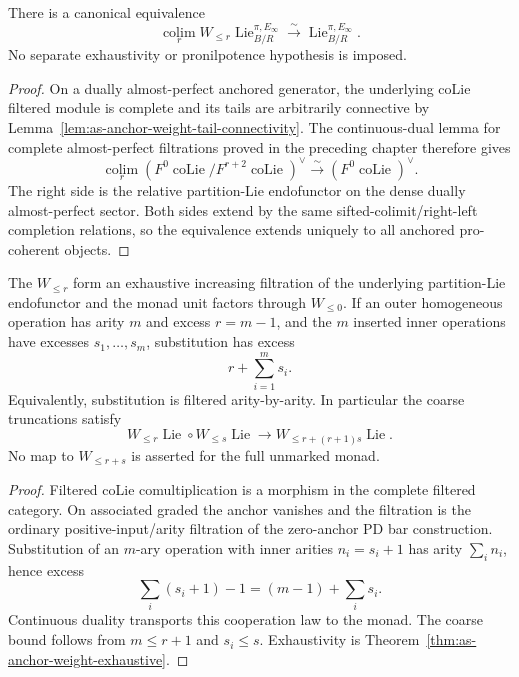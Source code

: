 \begin{theorem}
\label{thm:as-anchor-weight-exhaustive}
There is a canonical equivalence
\[
\boxed{
    \operatorname*{colim}_{r}
    W_{\le r}
    \operatorname{Lie}^{\pi,E_\infty}_{B/R}
    \xrightarrow{\sim}
    \operatorname{Lie}^{\pi,E_\infty}_{B/R}.
}
\]
No separate exhaustivity or pronilpotence hypothesis is imposed.
\end{theorem}

\begin{proof}
On a dually almost-perfect anchored generator, the underlying coLie filtered
module is complete and its tails are arbitrarily connective by
Lemma~\ref{lem:as-anchor-weight-tail-connectivity}.  The continuous-dual
lemma for complete almost-perfect filtrations proved in the preceding chapter
therefore gives
\[
    \operatorname*{colim}_r
    \left(
        F^0\operatorname{coLie}/
        F^{r+2}\operatorname{coLie}
    \right)^\vee
    \xrightarrow{\sim}
    \left(
        F^0\operatorname{coLie}
    \right)^\vee.
\]
The right side is the relative partition-Lie endofunctor on the dense
dually almost-perfect sector.  Both sides extend by the same
sifted-colimit/right-left completion relations, so the equivalence extends
uniquely to all anchored pro-coherent objects.
\end{proof}

\begin{theorem}
\label{prop:as-filtered-partition-monad}
The $W_{\le r}$ form an exhaustive increasing filtration of the underlying
partition-Lie endofunctor and the monad unit factors through $W_{\le0}$.
If an outer homogeneous operation has arity $m$ and excess $r=m-1$, and the
$m$ inserted inner operations have excesses $s_1,\ldots,s_m$, substitution
has excess
\[
\boxed{
    r+\sum_{i=1}^m s_i.
}
\]
Equivalently, substitution is filtered arity-by-arity.  In particular the
coarse truncations satisfy
\[
\boxed{
    W_{\le r}\operatorname{Lie}
    \circ
    W_{\le s}\operatorname{Lie}
    \longrightarrow
    W_{\le r+(r+1)s}\operatorname{Lie}.
}
\]
No map to $W_{\le r+s}$ is asserted for the full unmarked monad.
\end{theorem}

\begin{proof}
Filtered coLie comultiplication is a morphism in the complete filtered
category.  On associated graded the anchor vanishes and the filtration is the
ordinary positive-input/arity filtration of the zero-anchor PD bar
construction.  Substitution of an $m$-ary operation with inner arities
$n_i=s_i+1$ has arity $\sum_i n_i$, hence excess
\[
    \sum_i(s_i+1)-1=(m-1)+\sum_i s_i.
\]
Continuous duality transports this cooperation law to the monad.  The coarse
bound follows from $m\le r+1$ and $s_i\le s$.  Exhaustivity is
Theorem~\ref{thm:as-anchor-weight-exhaustive}.
\end{proof}

